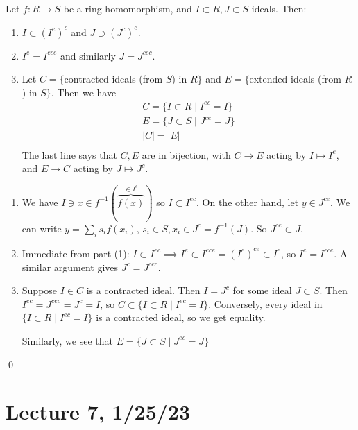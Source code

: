 \documentclass[x11names,reqno,14pt]{extarticle}
\begin{document}
\prop

Let $f:R\to S$ be a ring homomorphism, and $I \subset R, J \subset S$ ideals. Then:

\begin{enumerate}

\item $I \subset (I^e)^c$ and $J \supset (J^c)^e$.

\item $I^e = I^{ece}$ and similarly $J = J^{cec}$.

\item Let $C = \{$contracted ideals (from $S$) in $R\}$ and $E = \{$extended ideals (from $R$) in $S\}$. Then we have
\begin{align*}
C = \{I\subset R \mid I^{ec} = I \} \\
E = \{J\subset S \mid J^{ce} = J \} \\
|C| = |E| \\
\end{align*}
The last line says that $C, E$ are in bijection, with $C\to E$ acting by $I\mapsto I^e$, and $E\to C$ acting by $J\mapsto J^c$. 


\end{enumerate}

\proof

\begin{enumerate}

\item We have $I \ni x \in f^{-1}(\overbrace{f(x)}^{\in I^e})$ so $I \subset I^{ec}$. On the other hand, let $y \in J^{ce}$. We can write $y = \sum_is_if(x_i)$, $s_i \in S, x_i \in J^c = f^{-1}(J)$.  So $J^{ce} \subset J$.

\item Immediate from part (1): $I \subset I^{ec} \implies I^e\subset I^{ece} = (I^e)^{ce} \subset I^e$, so $I^e = I^{ece}$. A similar argument gives $J^c = J^{cec}$. 

\item Suppose $I \in C$ is a contracted ideal. Then $I = J^c$ for some ideal $J \subset S$. Then $I^{ec} = J^{cec} = J^c = I$, so $C \subset \{I \subset R \mid I^{ec} = I \}$. Conversely, every ideal in $\{I \subset R \mid I^{ec} = I\}$ is a contracted ideal, so we get equality. 

Similarly, we see that $E = \{J \subset S \mid J^{ec} = J\}$

\end{enumerate}

\qed

\section*{Lecture 7, 1/25/23}
\end{document}

